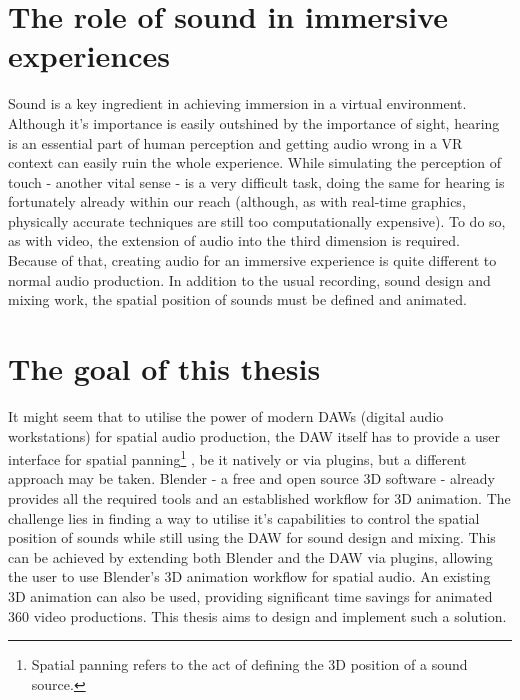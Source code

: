 \section*{The role of sound in immersive experiences}
Sound is a key ingredient in achieving immersion in a virtual environment.
Although it's importance is easily outshined by the importance of sight, hearing is an essential part of human perception
and getting audio wrong in a VR context can easily ruin the whole experience.
While simulating the perception of touch - another vital sense - is a very difficult task, doing the same for hearing is fortunately already within our reach 
(although, as with real-time graphics, physically accurate techniques are still too computationally expensive).
To do so, as with video, the extension of audio into the third dimension is required.
Because of that, creating audio for an immersive experience is quite different to normal audio production.
In addition to the usual recording, sound design and mixing work, the spatial position of sounds must be defined and animated.

\section*{The goal of this thesis}
It might seem that to utilise the power of modern DAWs (digital audio workstations) for spatial audio production,
the DAW itself has to provide a user interface for spatial panning\footnote{Spatial panning refers to the act of defining the 3D position of a sound source.}
, be it natively or via plugins,
but a different approach may be taken.
Blender - a free and open source 3D software - already provides all the required tools and an established workflow for 3D animation.
The challenge lies in finding a way to utilise it's capabilities to control the spatial position of sounds while still using the DAW for sound design and mixing.
This can be achieved by extending both Blender and the DAW via plugins, allowing the user to use Blender's 3D animation workflow for spatial audio.
An existing 3D animation can also be used, providing significant time savings for animated 360\degree{} video productions.
This thesis aims to design and implement such a solution.

